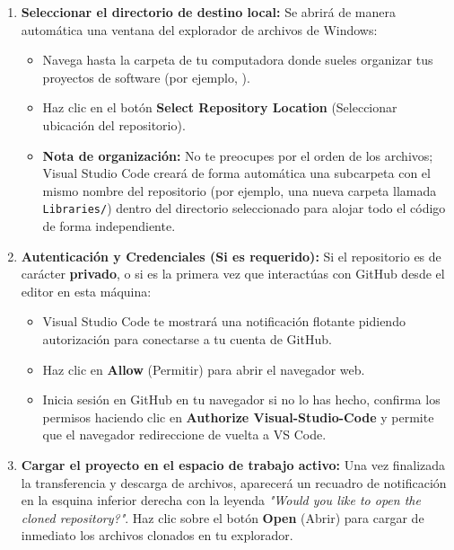 \documentclass[
10pt, %
a4paper, %
oneside, %
headinclude,footinclude, %
BCOR5mm, %
]{scrartcl}
\begin{document}
\begin{enumerate}
	\item \textbf{Seleccionar el directorio de destino local:}
	Se abrirá de manera automática una ventana del explorador de archivos de Windows:
	\begin{itemize}
		\item Navega hasta la carpeta de tu computadora donde sueles organizar tus proyectos de software (por ejemplo, ).
		\item Haz clic en el botón \textbf{Select Repository Location} (Seleccionar ubicación del repositorio).
		\item \textbf{Nota de organización:} No te preocupes por el orden de los archivos; Visual Studio Code creará de forma automática una subcarpeta con el mismo nombre del repositorio (por ejemplo, una nueva carpeta llamada \texttt{Libraries/}) dentro del directorio seleccionado para alojar todo el código de forma independiente.
	\end{itemize}
	
	\item \textbf{Autenticación y Credenciales (Si es requerido):}
	Si el repositorio es de carácter \textbf{privado}, o si es la primera vez que interactúas con GitHub desde el editor en esta máquina:
	\begin{itemize}
		\item Visual Studio Code te mostrará una notificación flotante pidiendo autorización para conectarse a tu cuenta de GitHub.
		\item Haz clic en \textbf{Allow} (Permitir) para abrir el navegador web.
		\item Inicia sesión en GitHub en tu navegador si no lo has hecho, confirma los permisos haciendo clic en \textbf{Authorize Visual-Studio-Code} y permite que el navegador redireccione de vuelta a VS Code.
	\end{itemize}
	
	\item \textbf{Cargar el proyecto en el espacio de trabajo activo:}
	Una vez finalizada la transferencia y descarga de archivos, aparecerá un recuadro de notificación en la esquina inferior derecha con la leyenda \textit{"Would you like to open the cloned repository?"}. Haz clic sobre el botón \textbf{Open} (Abrir) para cargar de inmediato los archivos clonados en tu explorador.
\end{enumerate}
\end{document}
